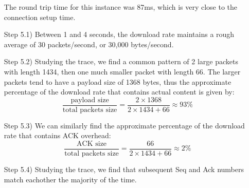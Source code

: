 \documentclass[12pt]{article}
\begin{document}
\begin{itemize}
\begin{center}
        \end{center}
        The round trip time for this instance was 87ms, which is very close to the
        connection setup time.

    \item [Step 5.1)] Between 1 and 4 seconds, the download rate maintains
        a rough average of 30 packets/second, or 30,000 bytes/second.

    \item [Step 5.2)] Studying the trace, we find a common pattern of 2
        large packets with length 1434, then one much smaller packet with length 66.
        The larger packets tend to have a payload size of 1368 bytes, thus
        the approximate percentage of the download rate that contains actual content
        is given by:
        \[
            \frac{\text{payload size}}{\text{total packets size}}
            = \frac{2\times1368}{2\times1434 + 66}
            \approx 93\%
        \]

    \item [Step 5.3)] We can similarly find the approximate percentage of the download
        rate that contains ACK overhead:
        \[
            \frac{\text{ACK size}}{\text{total packets size}}
            = \frac{66}{2\times1434 + 66}
            \approx 2\%
        \]

    \item [Step 5.4)] Studying the trace, we find that subsequent Seq and Ack numbers match
        eachother the majority of the time.
    \end{itemize}
\end{document}
